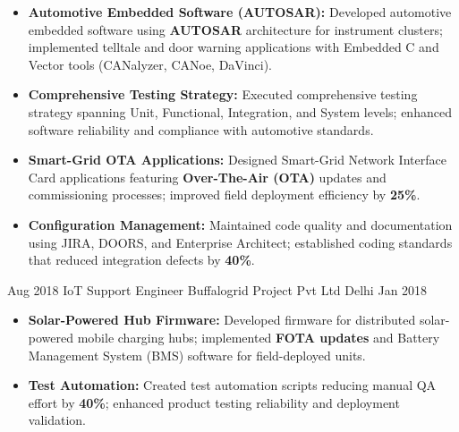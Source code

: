 \begin{experiences}
{\begin{itemize}
                \item \textbf{Automotive Embedded Software (AUTOSAR):} Developed automotive embedded software using \textbf{AUTOSAR} architecture for instrument clusters; implemented telltale and door warning applications with Embedded C and Vector tools (CANalyzer, CANoe, DaVinci).
                \item \textbf{Comprehensive Testing Strategy:} Executed comprehensive testing strategy spanning Unit, Functional, Integration, and System levels; enhanced software reliability and compliance with automotive standards.
                \item \textbf{Smart-Grid OTA Applications:} Designed Smart-Grid Network Interface Card applications featuring \textbf{Over-The-Air (OTA)} updates and commissioning processes; improved field deployment efficiency by \textbf{25\%}.
                \item \textbf{Configuration Management:} Maintained code quality and documentation using JIRA, DOORS, and Enterprise Architect; established coding standards that reduced integration defects by \textbf{40\%}.
            \end{itemize}    
        }
        {}       
        
\experience
  {Aug 2018}   %
  {IoT Support Engineer}  %
  {Buffalogrid Project Pvt Ltd}  %
  {Delhi}  %
  {Jan 2018}  %
  {   %
      \begin{itemize}
          \item \textbf{Solar-Powered Hub Firmware:} Developed firmware for distributed solar-powered mobile charging hubs; implemented \textbf{FOTA updates} and Battery Management System (BMS) software for field-deployed units.
          \item \textbf{Test Automation:} Created test automation scripts reducing manual QA effort by \textbf{40\%}; enhanced product testing reliability and deployment validation.
      \end{itemize}    
  }
  {}  %


\end{experiences}
